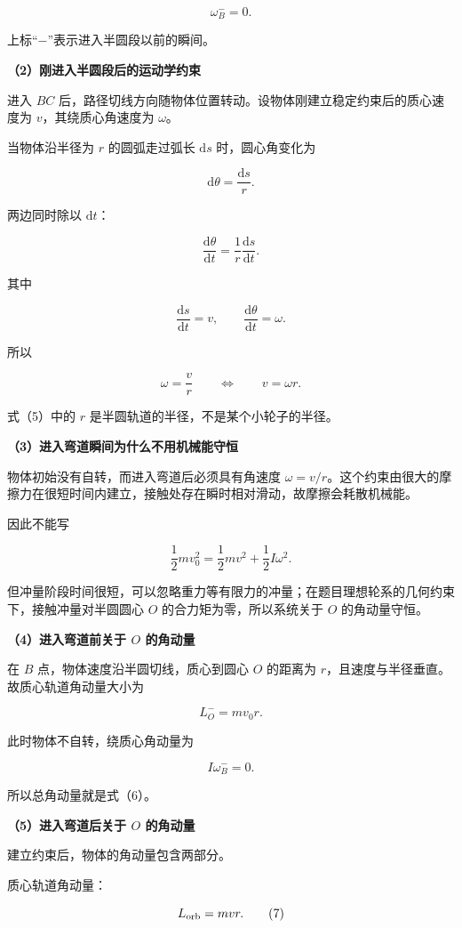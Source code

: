 \documentclass[12pt,a4paper,UTF8]{ctexart}
\begin{document}
\[
\omega_B^-=0.
\tag{2}
\]

上标``\(-\)''表示进入半圆段以前的瞬间。

\textbf{（2）刚进入半圆段后的运动学约束}

进入 \(BC\)
后，路径切线方向随物体位置转动。设物体刚建立稳定约束后的质心速度为
\(v\)，其绕质心角速度为 \(\omega\)。

当物体沿半径为 \(r\) 的圆弧走过弧长 \(\mathrm ds\) 时，圆心角变化为

\[
\mathrm d\theta=\frac{\mathrm ds}{r}.
\tag{3}
\]

两边同时除以 \(\mathrm dt\)：

\[
\frac{\mathrm d\theta}{\mathrm dt}
=\frac1r\frac{\mathrm ds}{\mathrm dt}.
\tag{4}
\]

其中

\[
\frac{\mathrm ds}{\mathrm dt}=v,
\qquad
\frac{\mathrm d\theta}{\mathrm dt}=\omega.
\]

所以

\[
\boxed{\omega=\frac vr}
\qquad\Longleftrightarrow\qquad
\boxed{v=\omega r}.
\tag{5}
\]

式（5）中的 \(r\) 是半圆轨道的半径，不是某个小轮子的半径。

\textbf{（3）进入弯道瞬间为什么不用机械能守恒}

物体初始没有自转，而进入弯道后必须具有角速度
\(\omega=v/r\)。这个约束由很大的摩擦力在很短时间内建立，接触处存在瞬时相对滑动，故摩擦会耗散机械能。

因此不能写

\[
\frac12mv_0^2
=\frac12mv^2+\frac12I\omega^2.
\]

但冲量阶段时间很短，可以忽略重力等有限力的冲量；在题目理想轮系的几何约束下，接触冲量对半圆圆心
\(O\) 的合力矩为零，所以系统关于 \(O\) 的角动量守恒。

\textbf{（4）进入弯道前关于 \(O\) 的角动量}

在 \(B\) 点，物体速度沿半圆切线，质心到圆心 \(O\) 的距离为
\(r\)，且速度与半径垂直。故质心轨道角动量大小为

\[
L_O^-=m v_0 r.
\tag{6}
\]

此时物体不自转，绕质心角动量为

\[
I\omega_B^-=0.
\]

所以总角动量就是式（6）。

\textbf{（5）进入弯道后关于 \(O\) 的角动量}

建立约束后，物体的角动量包含两部分。

质心轨道角动量：

\[
L_{\rm orb}=mvr.
\tag{7}
\]
\end{document}
